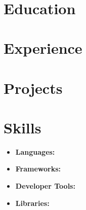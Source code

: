 \documentclass[letterpaper,11pt]{article}
\newcommand{\resumeSubHeadingListStart}{\begin{itemize}[leftmargin=0.15in, label={}]}
\newcommand{\resumeSubHeadingListEnd}{\end{itemize}}
\begin{document}
\begin{center}
  {\Huge \bfseries  } \\[4pt]
   \textbar{}  \href{mailto:}{} \textbar{}
  \href{}{} \textbar{}
  \href{}{}
\end{center}

\section{Education}
\resumeSubHeadingListStart

\resumeSubHeadingListEnd

\section{Experience}
\resumeSubHeadingListStart

\resumeSubHeadingListEnd

\section{Projects}
\resumeSubHeadingListStart

\resumeSubHeadingListEnd

\section{Skills}
\begin{itemize}[leftmargin=0.15in, label={}]
  \item[] \textbf{Languages:} 
  \item[] \textbf{Frameworks:} 
  \item[] \textbf{Developer Tools:} 
  \item[] \textbf{Libraries:} 
\end{itemize}
\end{document}
